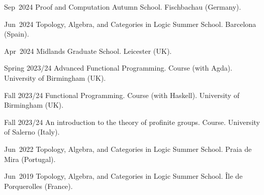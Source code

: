 
\chronorow
  {Sep~2024}
  {Proof and Computation}
  {Autumn School. \gray Fischbachau (Germany).}

\chronorow
  {Jun~2024}
  {Topology, Algebra, and Categories in Logic}
  {Summer School. \gray Barcelona (Spain).}

\chronorow
  {Apr~2024}
  {Midlands Graduate School.}
  {\gray Leicester (UK).}

\chronorow
  {Spring 2023/24}
  {Advanced Functional Programming.}
  {Course (with Agda). \gray University of Birmingham (UK).}

\chronorow
  {Fall 2023/24}
  {Functional Programming.}
  {Course (with Haskell). \gray University of Birmingham (UK).}

\chronorow
  {Fall 2023/24}
  {An introduction to the theory of profinite groups.}
  {Course. \gray University of Salerno (Italy).} %

\chronorow
  {Jun~2022}
  {Topology, Algebra, and Categories in Logic}
  {Summer School. \gray Praia de Mira (Portugal).}

\chronorow
  {Jun~2019}
  {Topology, Algebra, and Categories in Logic}
  {Summer School. \gray \^Ile de Porquerolles (France).}

